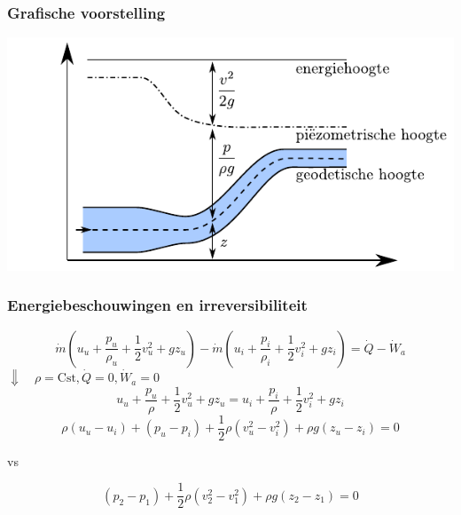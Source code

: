 \documentclass[t]{beamer}
\begin{document}
	\begin{frame}
		\frametitle{Grafische voorstelling}
		\vspace{1cm}
		\center
		\includegraphics{../fig/deeltjesvergelijkingen/Energiehoogte}
	\end{frame}
	\begin{frame}
		\frametitle{Energiebeschouwingen en irreversibiliteit}
		\begin{equation*}
			\dot{m} (u_u + \frac{p_u}{\rho_u} + \frac{1}{2}v^2_u + g z_u) - \dot{m} (u_i + \frac{p_i}{\rho_i}+ \frac{1}{2}v^2_i + g z_i) = \dot{Q}-\dot{W}_a
		\end{equation*}
		\pause
			\hspace{5cm} $\Downarrow \quad \rho = \textrm{Cst}, \dot{Q} = 0, \dot{W}_a = 0$ 
		\begin{equation*}
			u_u + \frac{p_u}{\rho} + \frac{1}{2}v^2_u + g z_u = u_i + \frac{p_i}{\rho}+ \frac{1}{2}v^2_i + g z_i
		\end{equation*}
		\pause
		\begin{equation*}
			\rho (u_u-u_i) + (p_u-p_i) + \frac{1}{2} \rho (v_u^2-v_i^2) + \rho g (z_u-z_i) = 0
		\end{equation*}
		\pause
		\begin{center}
			vs
		\end{center}
		\begin{equation*}
			(p_2-p_1) + \frac{1}{2} \rho (v_2^2-v_1^2) + \rho g (z_2-z_1) = 0
		\end{equation*}
	\end{frame}
\end{document}
